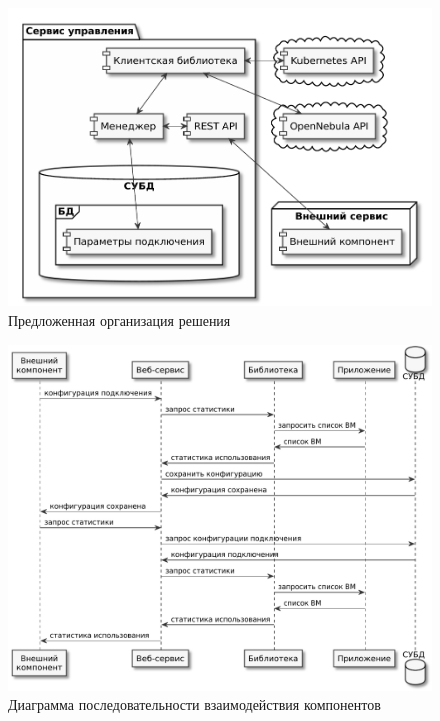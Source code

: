 \begin{figure}[hbtp]
    \centering
    \includegraphics[width=\textwidth]{img/approach-organization.pdf}
    \caption{Предложенная организация решения}
    \label{approach-organization}
\end{figure}

\begin{figure}[hbtp]
    \centering
    \includegraphics[width=\textwidth]{img/architecture-sequence.pdf}
    \caption{Диаграмма последовательности взаимодействия компонентов}
    \label{architecture-sequence}
\end{figure}

